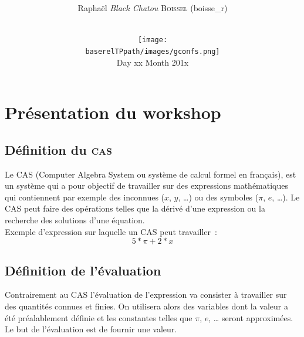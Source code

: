 \documentclass[12pt,a4paper]{report}
\newcommand{\cas}{\textsc{CAS}}
\begin{document}
\title{
  \vspace{1cm}
  \textbf{\Huge{\Tp{} \workshoptitle}}\\
}
\author{
  \Large{Raphaël \textit{Black Chatou} \textsc{Boissel} ({\ttfamily boisse\_r})}\\\\
}

\date{
  \vspace{1cm}
  \texttt{[image: \\baserelTPpath/images/gconfs.png]}\\
  \vspace{0.5cm}
  Day xx Month 201x
}
\maketitle
\newpage
\tableofcontents
\newpage

\section{Présentation du workshop}

\subsection{Définition du \textsc{cas}}

Le \cas{} (Computer Algebra System ou système de calcul formel en français), est un système qui a pour objectif de travailler sur des expressions mathématiques qui contiennent par exemple des inconnues ($x$, $y$, \ldots) ou des symboles ($\pi$, $e$, \ldots). Le \cas{} peut faire des opérations telles que la dérivé d'une expression ou la recherche des solutions d'une équation.\\

Exemple d'expression sur laquelle un \cas{} peut travailler~:
$$5*\pi+2*x$$

\subsection{Définition de l'évaluation}

Contrairement au \cas{} l'évaluation de l'expression va consister à travailler sur des quantités connues et finies. On utilisera alors des variables dont la valeur a été préalablement définie et les constantes telles que $\pi$, $e$, \ldots{} seront approximées. Le but de l'évaluation est de fournir une valeur.
\end{document}
